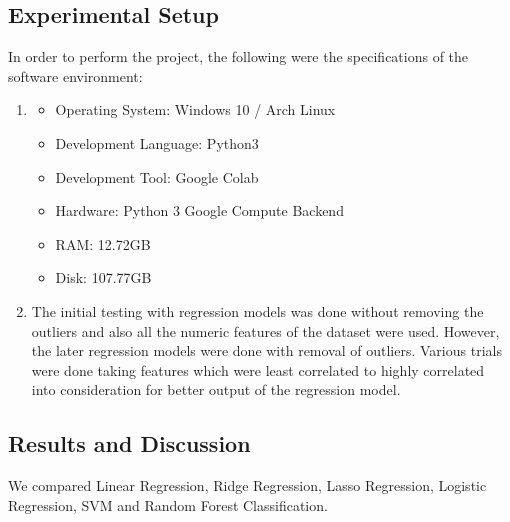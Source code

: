 \documentclass[conference]{IEEEtran}
\begin{document}
\subsection{Experimental Setup}
In order to perform the project, the following were the specifications of the software environment:
\begin{enumerate}[label=\roman*.]
\item
\begin{itemize}
\item[] Operating System: Windows 10 / Arch Linux
\item[]Development Language: Python3
\item[]Development Tool: Google Colab
\item[]Hardware: Python 3 Google Compute Backend
\item[]RAM: 12.72GB
\item[]Disk: 107.77GB
\end{itemize}

\item The initial testing with regression models was done without removing the outliers and also all the numeric features of the dataset were used. However, the later regression models were done with removal of outliers. Various trials were done taking features which were least correlated to highly correlated into consideration for better output of the regression model.
\end{enumerate}

\subsection{Results and Discussion}\label{recall}
We compared Linear Regression, Ridge Regression, Lasso Regression, Logistic Regression, SVM and Random Forest Classification. 
\end{document}
